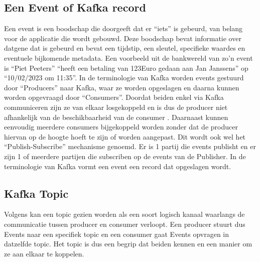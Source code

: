 \subsection{Een Event of Kafka record}
Een event is een boodschap die doorgeeft dat er ``iets'' is gebeurd, van belang voor de applicatie die wordt gebouwd. Deze boodschap bevat informatie over datgene dat is gebeurd en bevat een tijdstip, een sleutel, specifieke waardes en eventuele bijkomende metadata. Een voorbeeld uit de bankwereld van zo'n event is ``Piet Peeters'' ``heeft een betaling van 123Euro gedaan aan Jan Janssens'' op ``10/02/2023 om 11:35''.
\newline
In de terminologie van Kafka worden events gestuurd door ``Producers'' naar Kafka, waar ze worden opgeslagen en daarna kunnen worden opgevraagd door ``Consumers''. Doordat beiden enkel via Kafka communiceren zijn ze van elkaar losgekoppeld en is dus de producer niet afhankelijk van de beschikbaarheid van de consumer \autocite{Kafka2023}.
\newline
Daarnaast kunnen eenvoudig meerdere consumers bijgekoppeld worden zonder dat de producer hiervan op de hoogte hoeft te zijn of worden aangepast.
\newline
Dit wordt ook wel het ``Publish-Subscribe'' mechanisme genoemd. Er is 1 partij die events publisht en er zijn 1 of meerdere partijen die subscriben op de events van de Publisher.
In de terminologie van Kafka vormt een event een record dat opgeslagen wordt.


\subsection{Kafka Topic}
Volgens \textcite{Harbour2023} kan een topic gezien worden als een soort logisch kanaal waarlangs de communicatie tussen producer en consumer verloopt. Een producer stuurt dus Events naar een specifiek topic en een consumer gaat Events opvragen in datzelfde topic. Het topic is dus een begrip dat beiden kennen en een manier om ze aan elkaar te koppelen.


